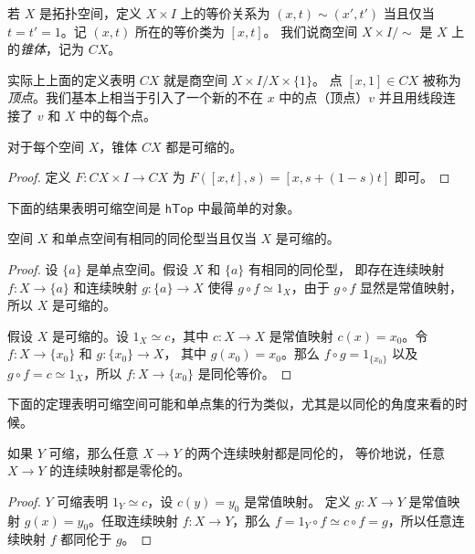 \documentclass[fontset=none]{Notes}
\newcommand{\cat}[1]{\mathsf{#1}}
\begin{document}
\begin{definition}
  若 $X$ 是拓扑空间，定义 $X\times I$ 上的等价关系为 $(x,t)\sim (x',t')$
  当且仅当 $t=t'=1$。记 $(x,t)$ 所在的等价类为 $[x,t]$。
  我们说商空间 $X\times I/\sim$ 是 $X$ 上的\emph{锥体}，记为 $CX$。
\end{definition}

实际上上面的定义表明 $CX$ 就是商空间 $X\times I/X\times\{1\}$。
点 $[x,1]\in CX$ 被称为\emph{顶点}。我们基本上相当于引入了一个新的不在
$x$ 中的点（顶点）$v$ 并且用线段连接了 $v$ 和 $X$ 中的每个点。

\begin{theorem}
  对于每个空间 $X$，锥体 $CX$ 都是可缩的。
\end{theorem}
\begin{proof}
  定义 $F:CX\times I\to CX$ 为
  $F([x,t],s)=[x,s+(1-s)t]$ 即可。
\end{proof}

下面的结果表明可缩空间是 $\cat{hTop}$ 中最简单的对象。

\begin{theorem}
  空间 $X$ 和单点空间有相同的同伦型当且仅当 $X$ 是可缩的。
\end{theorem}
\begin{proof}
  设 $\{a\}$ 是单点空间。假设 $X$ 和 $\{a\}$ 有相同的同伦型，
  即存在连续映射 $f:X\to\{a\}$ 和连续映射 $g:\{a\}\to X$
  使得 $g\circ f\simeq 1_X$，由于 $g\circ f$ 显然是常值映射，
  所以 $X$ 是可缩的。

  假设 $X$ 是可缩的。设 $1_X\simeq c$，其中 $c:X\to X$ 是常值映射
  $c(x)=x_0$。令 $f:X\to \{x_0\}$ 和 $g:\{x_0\}\to X$，
  其中 $g(x_0)=x_0$。那么 $f\circ g=1_{\{x_0\}}$ 以及
  $g\circ f=c\simeq 1_X$，所以 $f:X\to \{x_0\}$ 是同伦等价。
\end{proof}

下面的定理表明可缩空间可能和单点集的行为类似，尤其是以同伦的角度来看的时候。

\begin{theorem}
  如果 $Y$ 可缩，那么任意 $X\to Y$ 的两个连续映射都是同伦的，
  等价地说，任意 $X\to Y$ 的连续映射都是零伦的。
\end{theorem}
\begin{proof}
  $Y$ 可缩表明 $1_Y\simeq c$，设 $c(y)=y_0$ 是常值映射。
  定义 $g:X\to Y$ 是常值映射 $g(x)=y_0$。任取连续映射 $f:X\to Y$，那么
  $f=1_Y\circ f\simeq c\circ f=g$，所以任意连续映射 $f$
  都同伦于 $g$。
\end{proof}
 
\end{document}
